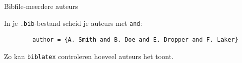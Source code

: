 \begin{frame}[fragile]{Bibfile-meerdere auteurs}
	
	In je \texttt{.bib}-bestand scheid je auteurs met \texttt{and}:
	\begin{verbatim}
		author = {A. Smith and B. Doe and E. Dropper and F. Laker}
	\end{verbatim}
	Zo kan \texttt{biblatex} controleren hoeveel auteurs het toont.
	
\end{frame}